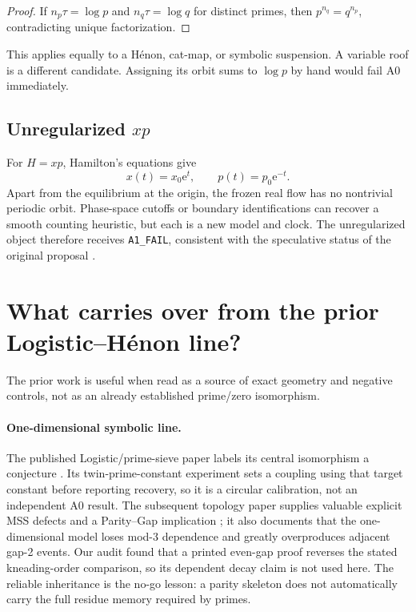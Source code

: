 \documentclass[11pt]{article}
\theoremstyle{definition}
\theoremstyle{remark}
\newcommand{\e}{\mathrm{e}}
\begin{document}
\begin{proof}
If \(n_p\tau=\log p\) and \(n_q\tau=\log q\) for distinct primes, then
\(p^{n_q}=q^{n_p}\), contradicting unique factorization.
\end{proof}

This applies equally to a H\'enon, cat-map, or symbolic suspension.  A variable
roof is a different candidate.  Assigning its orbit sums to \(\log p\) by hand
would fail A0 immediately.

\subsection{Unregularized \texorpdfstring{\(xp\)}{xp}}

For \(H=xp\), Hamilton's equations give
\[
 x(t)=x_0\e^t,\qquad p(t)=p_0\e^{-t}.
\]
Apart from the equilibrium at the origin, the frozen real flow has no
nontrivial periodic orbit.  Phase-space cutoffs or boundary identifications can
recover a smooth counting heuristic, but each is a new model and clock.  The
unregularized object therefore receives \texttt{A1\_FAIL}, consistent with the
speculative status of the original proposal \citep{BerryKeating1999}.

\section{What carries over from the prior Logistic--H\'enon line?}
\label{sec:prior}

The prior work is useful when read as a source of exact geometry and negative
controls, not as an already established prime/zero isomorphism.

\paragraph{One-dimensional symbolic line.}
The published Logistic/prime-sieve paper labels its central isomorphism a
conjecture \citep{Wang2026Prime}.  Its twin-prime-constant experiment sets a
coupling using that target constant before reporting recovery, so it is a
circular calibration, not an independent A0 result.  The subsequent topology
paper supplies valuable explicit MSS defects and a Parity--Gap implication
\citep{Wang2026Bounds}; it also documents that the one-dimensional model loses
mod-3 dependence and greatly overproduces adjacent gap-2 events.  Our audit
found that a printed even-gap proof reverses the stated kneading-order
comparison, so its dependent decay claim is not used here.  The reliable
inheritance is the no-go lesson: a parity skeleton does not automatically
carry the full residue memory required by primes.
\end{document}

